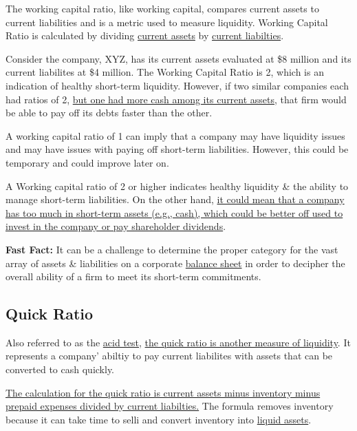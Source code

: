 \documentclass{article}
\begin{document}
	The working capital ratio, like working capital, compares current assets to current liabilities and is a metric used to measure liquidity. Working Capital Ratio is calculated by dividing \href{https://www.investopedia.com/terms/c/currentassets.asp}
	{current assets} by \href{https://www.investopedia.com/terms/c/currentliabilities.asp}{current liabilties}.

	Consider the company, XYZ, has its current assets evaluated at \$8 million and its current liabilites at \$4 million. The Working Capital Ratio is 2, which is an indication of healthy short-term liquidity.
	However, if two similar companies each had ratios of 2, \underline{but one had more cash among its current assets}, that firm would be able to pay off its debts faster than the other. \newline

	A working capital ratio of 1 can imply that a company may have liquidity issues and may have issues with paying off short-term liabilities. However, this could be temporary and could improve 
	later on. \newline

	A Working capital ratio of 2 or higher indicates healthy liquidity \& the ability to manage short-term liabilities. On the other hand, \underline{it could mean that a company has too much in 
	short-term assets (e.g., cash), which could be better off used to invest in the company or pay shareholder dividends}. \newline

	{\bf Fast Fact:} It can be a challenge to determine the proper category for the vast array of assets \& liabilities on a corporate \href{https://www.investopedia.com/terms/b/balancesheet.asp}{balance sheet}
	in order to decipher the overall ability of a firm to meet its short-term commitments.

	\subsection{Quick Ratio}

	Also referred to as the \href{https://www.investopedia.com/terms/a/acidtest.asp}{acid test}, \underline{the quick ratio is another measure of liquidity}. It represents a company' abiltiy to pay
	current liabilites with assets that can be converted to cash quickly. \newline

	\underline{The calculation for the quick ratio is current assets minus inventory minus prepaid expenses divided by current liabilties.} The formula removes inventory because it can take time to 
	selli and convert inventory into \href{https://www.investopedia.com/terms/l/liquidasset.asp}{liquid assets}. \newline
\end{document}
